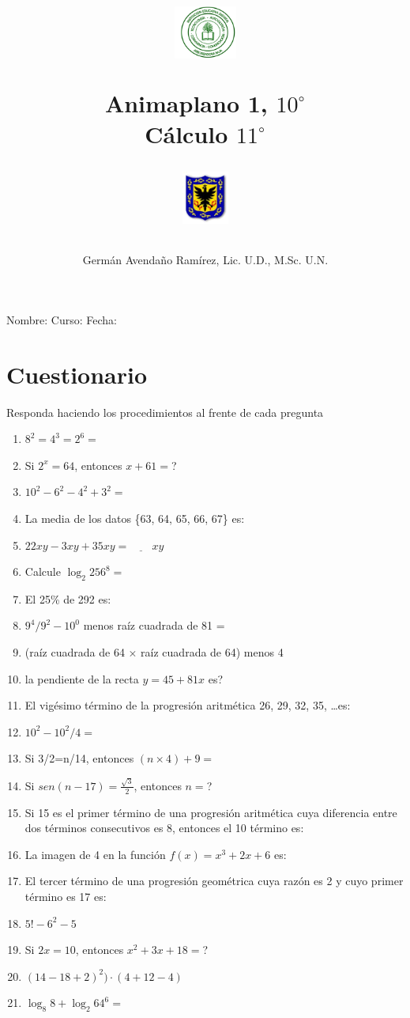 \documentclass[11pt,twoside,letterpaper]{article}
\author{Germ\'an Avenda\~no Ram\'irez, Lic. U.D., M.Sc. U.N.}
\title{\begin{minipage}{.2\textwidth}
\includegraphics[height=1.75cm]{Images/logo-colegio.png}\end{minipage}
\begin{minipage}{.55\textwidth}
\begin{center}
Animaplano 1, $10^{\circ}$  \\
Cálculo $11^{\circ}$
\end{center}
\end{minipage}\hfill
\begin{minipage}{.2\textwidth}
\includegraphics[height=1.75cm]{Images/logo-sed.png} 
\end{minipage}}
\date{}
\begin{document}
\maketitle
Nombre: \hrulefill Curso: \underline{\hspace*{44pt}} Fecha: \underline{\hspace*{2.5cm}}
\section*{Cuestionario}
Responda haciendo los procedimientos al frente de cada pregunta
\begin{enumerate}
 \item $8^{2}=4^{3}=2^{6}=$
 \item Si $2^{x}=64$, entonces $x+61=$?
 \item $10^{2}-6^{2}-4^{2}+3^{2}=$
 \item La media de los datos \{63, 64, 65, 66, 67\} es:
 \item $22xy-3xy+35xy=\underline{\hspace{24pt}}xy$
 \item Calcule $\log_{2}256^{8}=$
 \item El 25\% de 292 es:
 \item $9^{4}/9^{2}-10^{0}$ menos raíz cuadrada de 81 =
 \item (raíz cuadrada de 64 $\times$ raíz cuadrada de 64) menos 4
 \item la pendiente de la recta $y=45+81x$ es?
 \item El vigésimo término de la progresión aritmética 26, 29, 32, 35, \dots es:
 \item $10^{2}-10^{2}/4=$
 \item Si 3/2=n/14, entonces $(n\times4)+9=$
 \item Si $sen(n-17)=\frac{\sqrt{3}}{2}$, entonces $n=$?
 \item Si 15 es el primer término de una progresión aritmética cuya diferencia entre dos términos consecutivos es 8, entonces el 10 término es:
 \item La imagen de 4 en la función $f(x)=x^{3}+2x+6$ es:
 \item El tercer término de una progresión geométrica cuya razón es 2 y cuyo primer término es 17 es:
 \item $5!-6^{2}-5$
 \item Si $2x=10$, entonces $x^{2}+3x+18=$?
 \item $(14-18+2)^{2})\cdot(4+12-4)$
 \item $\log_{8}8+\log_{2}64^{6}=$

\end{enumerate}
\end{document}
